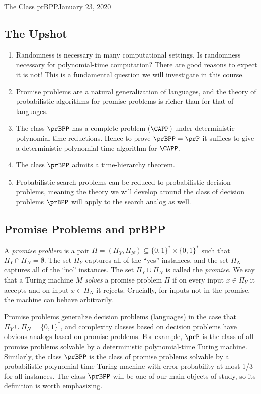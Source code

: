 \begin{lecture}{1}{The Class prBPP}{January 23, 2020}
\label{lec:01}

\subsection*{The Upshot}

\begin{enumerate}
  \item Randomness is necessary in many computational settings. Is randomness
    necessary for polynomial-time computation? There are good reasons to expect
    it is not! This is a fundamental question we will investigate in this
    course.
  \item Promise problems are a natural generalization of languages, and the
    theory of probabilistic algorithms for promise problems is richer than
    for that of languages.
  \item The class $\prBPP$ has a complete problem ($\CAPP$) under deterministic
    polynomial-time reductions. Hence to prove $\prBPP = \prP$ it suffices
    to give a deterministic polynomial-time algorithm for $\CAPP$.
  \item The class $\prBPP$ admits a time-hierarchy theorem.
  \item Probabilistic search problems can be reduced to probabilistic decision
    problems, meaning the theory we will develop around the class of decision
    problems $\prBPP$ will apply to the search analog as well.
\end{enumerate}

\subsection{Promise Problems and prBPP}

A \emph{promise problem} is a pair $\Pi = (\Pi_Y, \Pi_N) \subseteq \{0, 1\}^*
\times \{0, 1\}^*$ such that $\Pi_Y \cap \Pi_N = \emptyset$. The set $\Pi_Y$
captures all of the ``yes'' instances, and the set $\Pi_N$ captures all of the
``no'' instances. The set $\Pi_Y \cup \Pi_N$ is called the \emph{promise}. We
say that a Turing machine $M$ \emph{solves} a promise problem $\Pi$ if on
every input $x \in \Pi_Y$ it accepts and on input $x \in \Pi_N$ it rejects.
Crucially, for inputs not in the promise, the machine can behave arbitrarily.

Promise problems generalize decision problems (languages) in the case that
$\Pi_Y \cup \Pi_N = \{0,1\}^*$, and complexity classes based on decision
problems have obvious analogs based on promise problems. For example, $\prP$ is
the class of all promise problems solvable by a deterministic polynomial-time
Turing machine. Similarly, the class $\prBPP$ is the class of promise problems
solvable by a probabilistic polynomial-time Turing machine with error
probability at most 1/3 for all instances. The class $\prBPP$ will be one of
our main objects of study, so its definition is worth emphasizing.


\end{lecture}
